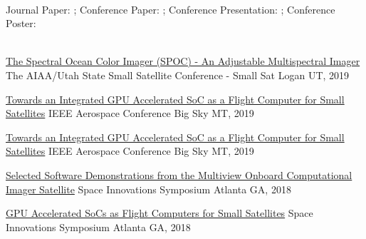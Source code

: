 \documentclass[10pt,a4paper]{article}
\begin{document}
\spacedhrule{0.5em}{-0.4em}
\vspace{-0.2em}
~\\
\centerline{
Journal Paper: {\color{bluegreen} \faFileTextO} ; \hspace{2mm} Conference Paper: {\color{bluegreen} \faStickyNoteO} ; \hspace{2mm}
Conference Presentation: {\color{bluegreen} \faTelevision} ; \hspace{2mm} Conference Poster: {\color{bluegreen} \faMapO}
}
\\
\headedsection
  {{\color{bluegreen} \faStickyNoteO} \href{http://smallsat.uga.edu/images/documents/papers/david_smallsat_2019_paper.pdf}{The Spectral Ocean Color Imager (SPOC) - An Adjustable Multispectral Imager}}{%
  \headedsubsection
    {The AIAA/Utah State Small Satellite Conference - Small Sat}
    {Logan UT, 2019}
    {}
}

\headedsection
  {{\color{bluegreen} \faStickyNoteO} \href{http://smallsat.uga.edu/images/documents/papers/Adams_GPU_Paper.pdf}{Towards an Integrated GPU Accelerated SoC as a Flight Computer for Small Satellites}}{%
  \headedsubsection
    {IEEE Aerospace Conference}
    {Big Sky MT, 2019}
    {}
}

\headedsection
  {{\color{bluegreen} \faTelevision} \href{http://smallsat.uga.edu/images/documents/presentations/IEEE_Aerospace_GPU_Presentation.pdf}{Towards an Integrated GPU Accelerated SoC as a Flight Computer for Small Satellites}}{%
  \headedsubsection
    {IEEE Aerospace Conference}
    {Big Sky MT, 2019}
    {}
}

\headedsection
  {{\color{bluegreen} \faTelevision} \href{http://smallsat.uga.edu/images/documents/presentations/MOCI_Software_Demo2018.pdf}{Selected Software Demonstrations from the Multiview Onboard Computational Imager Satellite}}{%
  \headedsubsection
    {Space Innovations Symposium}
    {Atlanta GA, 2018}
    {}
}

\headedsection
  {{\color{bluegreen} \faMapO} \href{http://smallsat.uga.edu/images/documents/posters/GPU_SmallSatposter.pdf}{GPU Accelerated SoCs as Flight Computers for Small Satellites}}{%
  \headedsubsection
    {Space Innovations Symposium}
    {Atlanta GA, 2018}
    {}
}
\end{document}
